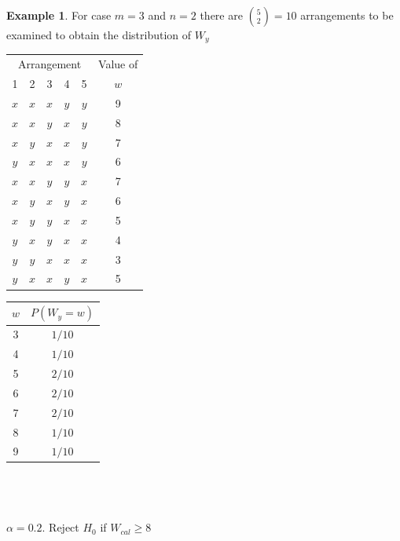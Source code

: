 \documentclass[12pt,a4paper]{report}
\theoremstyle{definition}
\newtheorem{exa}[thm]{Example}
\theoremstyle{plain}
\begin{document}
\begin{exa}
For case $m = 3$ and $n  = 2$ there are $\binom{5}{2} = 10$ arrangements to be examined to obtain the distribution of $W_y$\\
\begin{minipage}{4in}
\begin{tabular}{cccccc}
\multicolumn{5}{c}{Arrangement} & Value of\\
1 & 2 & 3 & 4 & 5 & $w$\\
$x$ & $x$ & $x$ & $y$ & $y$ & 9\\
$x$ & $x$ & $y$ & $x$ & $y$ & 8\\
$x$ & $y$ & $x$ & $x$ & $y$ & 7\\
$y$ & $x$ & $x$ & $x$ & $y$ & 6\\
$x$ & $x$ & $y$ & $y$ & $x$ & 7\\
$x$ & $y$ & $x$ & $y$ & $x$ & 6\\
$x$ & $y$ & $y$ & $x$ & $x$ & 5\\
$y$ & $x$ & $y$ & $x$ & $x$ & 4\\
$y$ & $y$ & $x$ & $x$ & $x$ & 3\\
$y$ & $x$ & $x$ & $y$ & $x$ & 5\\
\end{tabular}
\end{minipage}
\hfill
\begin{minipage}{4in}
\begin{tabular}{c|c}
$w$ & $P\left(W_y = w\right)$\\
\hline
3 & $1/10$\\
4 & $1/10$\\
5 & $2/10$\\
6 & $2/10$\\
7 & $2/10$\\
8 & $1/10$\\
9 & $1/10$\\
\hline
\end{tabular}\\\\\\
$\alpha = 0.2$. Reject $H_0$ if  $W_{cal} \geq 8$
\end{minipage}
\end{exa}

\vspace{0.5cm}
\end{document}
